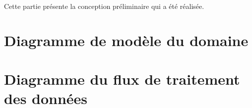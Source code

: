 \par Cette partie présente la conception préliminaire qui a été réalisée.

	\section{Diagramme de modèle du domaine}


	\section{Diagramme du flux de traitement des données}
